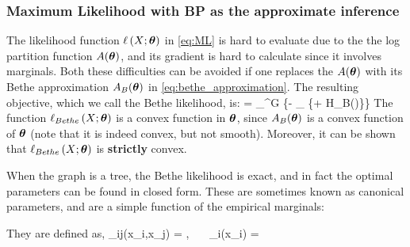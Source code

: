 \subsubsection{Maximum Likelihood with BP as the approximate inference}
\label{sec:Bethe_ML}
The likelihood function $\ell\left(X;\boldsymbol{\theta}\right)$ in \eqref{eq:ML} is hard to evaluate due to the the log partition function $A(\boldsymbol{\theta})$, and its gradient is hard to calculate since it involves marginals.
Both these difficulties can be avoided if one replaces the $A(\boldsymbol{\theta})$ with its Bethe approximation $A_B(\boldsymbol{\theta})$ in \eqref{eq:bethe_approximation}.
The resulting objective, which we call the Bethe likelihood, is:
\be
\label{eq:bethe_like}
  = \sup_{\thetav \in \Omega^G} \left\{\mubv \cdot \thetav - \sup_{\tauv \in \lclmargpoly} \left\{\tauv \cdot \thetav + H_B(\tauv)\right\}\right\}
\ee
The function $\ell_{Bethe}\left(X;\boldsymbol{\theta}\right)$ is a convex function in $\boldsymbol{\theta}$, since $A_B(\boldsymbol{\theta})$ is a convex function of $\boldsymbol{\theta}$ (note that it is indeed convex, but not smooth). 
Moreover, it can be shown that $\ell_{Bethe}\left(X; \boldsymbol{\theta}\right)$ is \textbf{strictly} convex.

When the graph is a tree, the Bethe likelihood is exact, and in fact the optimal parameters can be found in closed form.
These are sometimes known as canonical parameters, and are a simple function of the empirical marginals:

They are defined as,
\be
\label{eq:canonical}
\theta_{ij}(x_i,x_j) = , \ \ \ \theta_i(x_i) = 
\ee

